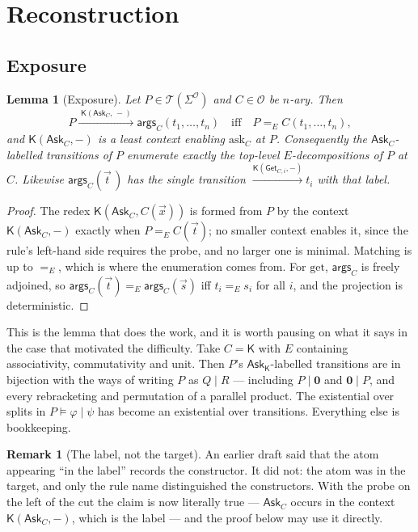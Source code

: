 \documentclass[11pt]{article}
\theoremstyle{plain}
\newtheorem{lemma}[theorem]{Lemma}
\theoremstyle{definition}
\newtheorem{remark}[theorem]{Remark}
\newcommand{\Kc}{\mathsf{K}}
\newcommand{\Ask}{\mathsf{Ask}}
\newcommand{\Get}{\mathsf{Get}}
\newcommand{\args}{\mathsf{args}}
\newcommand{\Terms}{\mathcal{T}}
\newcommand{\Ob}{\mathcal{O}}
\begin{document}
\section{Reconstruction}
\label{sec:recon}

\subsection{Exposure}

\begin{lemma}[Exposure]
\label{lem:exposure}
Let $P \in \Terms(\Sigma^\Ob)$ and $C \in \Ob$ be $n$-ary. Then
\[
P \xrightarrow{\;\Kc(\Ask_C,\,-)\;} \args_C(t_1,\dots,t_n)
\quad\text{iff}\quad
P =_E C(t_1,\dots,t_n),
\]
and $\Kc(\Ask_C,-)$ is a least context enabling $\mathrm{ask}_C$ at $P$. Consequently the
$\Ask_C$-labelled transitions of $P$ enumerate exactly the top-level $E$-decompositions of $P$ at $C$.
Likewise $\args_C(\vec t\,)$ has the single transition $\xrightarrow{\Kc(\Get_{C,i},-)} t_i$ with that
label.
\end{lemma}

\begin{proof}
The redex $\Kc(\Ask_C, C(\vec x))$ is formed from $P$ by the context $\Kc(\Ask_C,-)$ exactly when
$P =_E C(\vec t)$; no smaller context enables it, since the rule's left-hand side requires the probe,
and no larger one is minimal. Matching is up to $=_E$, which is where the enumeration comes from. For
$\mathrm{get}$, $\args_C$ is freely adjoined, so $\args_C(\vec t) =_E \args_C(\vec s)$ iff
$t_i =_E s_i$ for all $i$, and the projection is deterministic.
\end{proof}

This is the lemma that does the work, and it is worth pausing on what it says in the case that
motivated the difficulty. Take $C = \Kc$ with $E$ containing associativity, commutativity and unit.
Then $P$'s $\Ask_\Kc$-labelled transitions are in bijection with the ways of writing $P$ as $Q \mid R$
--- including $P \mid \mathbf{0}$ and $\mathbf{0} \mid P$, and every rebracketing and permutation of a
parallel product. The existential over splits in $P \models \varphi \mid \psi$ has become an existential
over transitions. Everything else is bookkeeping.

\begin{remark}[The label, not the target]
\label{rem:labelnottarget}
An earlier draft said that the atom appearing ``in the label'' records the constructor. It did not: the
atom was in the target, and only the rule name distinguished the constructors. With the probe on the
left of the cut the claim is now literally true --- $\Ask_C$ occurs in the context $\Kc(\Ask_C,-)$,
which is the label --- and the proof below may use it directly.
\end{remark}
\end{document}
